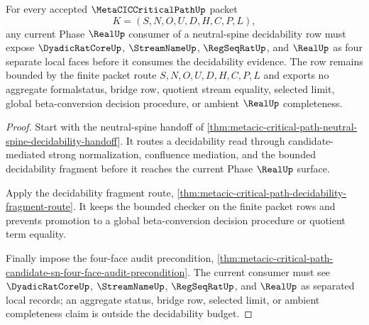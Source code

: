 \begin{theorem}
\label{thm:metacic-critical-path-neutral-spine-decidability-budget}
For every accepted $\MetaCICCriticalPathUp$ packet
$$
K=(S,N,O,U,D,H,C,P,L),
$$
any current Phase $\RealUp$ consumer of a neutral-spine decidability row must expose $\DyadicRatCoreUp$, $\StreamNameUp$, $\RegSeqRatUp$, and $\RealUp$ as four separate local faces before it consumes the decidability evidence. The row remains bounded by the finite packet route $S,N,O,U,D,H,C,P,L$ and exports no aggregate formalstatus, bridge row, quotient stream equality, selected limit, global beta-conversion decision procedure, or ambient $\RealUp$ completeness.
\end{theorem}
\begin{proof}
Start with the neutral-spine handoff of \autoref{thm:metacic-critical-path-neutral-spine-decidability-handoff}. It routes a decidability read through candidate-mediated strong normalization, confluence mediation, and the bounded decidability fragment before it reaches the current Phase $\RealUp$ surface.

Apply the decidability fragment route, \autoref{thm:metacic-critical-path-decidability-fragment-route}. It keeps the bounded checker on the finite packet rows and prevents promotion to a global beta-conversion decision procedure or quotient term equality.

Finally impose the four-face audit precondition, \autoref{thm:metacic-critical-path-candidate-sn-four-face-audit-precondition}. The current consumer must see $\DyadicRatCoreUp$, $\StreamNameUp$, $\RegSeqRatUp$, and $\RealUp$ as separated local records; an aggregate status, bridge row, selected limit, or ambient completeness claim is outside the decidability budget.
\end{proof}

